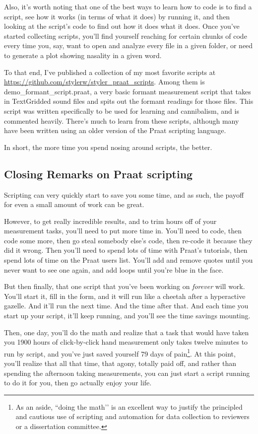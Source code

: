 \documentclass[11pt]{article}
\begin{document}
Also, it's worth noting that one of the best ways to learn how to code
is to find a script, see how it works (in terms of what it does) by
running it, and then looking at the script's code to find out how it
does what it does. Once you've started collecting scripts, you'll find
yourself reaching for certain chunks of code every time you, say, want
to open and analyze every file in a given folder, or need to generate a
plot showing nasality in a given word.

To that end, I've published a collection of my most favorite scripts at
\url{https://github.com/stylerw/styler_praat_scripts}. Among them is
demo\_formant\_script.praat, a very basic formant measurement script
that takes in TextGridded sound files and spits out the formant readings
for those files. This script was written specifically to be used for
learning and cannibalism, and is commented heavily. There's much to
learn from these scripts, although many have been written using an older
version of the Praat scripting language.

In short, the more time you spend nosing around scripts, the better.

\hypertarget{closing-remarks-on-praat-scripting}{%
\subsection{Closing Remarks on Praat
scripting}\label{closing-remarks-on-praat-scripting}}

Scripting can very quickly start to save you some time, and as such, the
payoff for even a small amount of work can be great.

However, to get really incredible results, and to trim hours off of your
measurement tasks, you'll need to put more time in. You'll need to code,
then code some more, then go steal somebody else's code, then re-code it
because they did it wrong. Then you'll need to spend lots of time with
Praat's tutorials, then spend lots of time on the Praat users list.
You'll add and remove quotes until you never want to see one again, and
add loops until you're blue in the face.

But then finally, that one script that you've been working on
\emph{forever} will work. You'll start it, fill in the form, and it will
run like a cheetah after a hyperactive gazelle. And it'll run the next
time. And the time after that. And each time you start up your script,
it'll keep running, and you'll see the time savings mounting.

Then, one day, you'll do the math and realize that a task that would
have taken you 1900 hours of click-by-click hand measurement only takes
twelve minutes to run by script, and you've just saved yourself 79 days
of
pain\footnote{As an aside, ``doing the math’’ is an excellent way to justify the principled and cautious use of scripting and automation for data collection to reviewers or a dissertation committee.}.
At this point, you'll realize that all that time, that agony, totally
paid off, and rather than spending the afternoon taking measurements,
you can just start a script running to do it for you, then go actually
enjoy your life.
\end{document}
